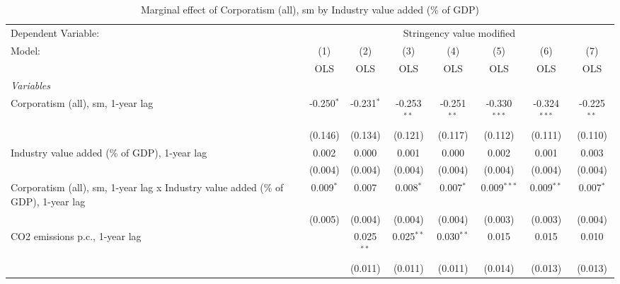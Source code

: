 
\begin{table}[htbp]
   \caption{Marginal effect of Corporatism (all), sm by Industry value added (\% of GDP)}
   \centering
   \begin{tabular}{lccccccc}
      \toprule
      Dependent Variable: & \multicolumn{7}{c}{Stringency value modified}\\
      Model:                                                                            & (1)          & (2)          & (3)           & (4)           & (5)            & (6)            & (7)\\  
                                                                                        &  OLS         & OLS          & OLS           & OLS           & OLS            & OLS            & OLS\\  
      \midrule
      \emph{Variables}\\
      Corporatism (all), sm, 1-year lag                                                 & -0.250$^{*}$ & -0.231$^{*}$ & -0.253$^{**}$ & -0.251$^{**}$ & -0.330$^{***}$ & -0.324$^{***}$ & -0.225$^{**}$\\   
                                                                                        & (0.146)      & (0.134)      & (0.121)       & (0.117)       & (0.112)        & (0.111)        & (0.110)\\   
      Industry value added (\% of GDP), 1-year lag                                      & 0.002        & 0.000        & 0.001         & 0.000         & 0.002          & 0.001          & 0.003\\   
                                                                                        & (0.004)      & (0.004)      & (0.004)       & (0.004)       & (0.004)        & (0.004)        & (0.004)\\   
      Corporatism (all), sm, 1-year lag x Industry value added (\% of GDP), 1-year lag  & 0.009$^{*}$  & 0.007        & 0.008$^{*}$   & 0.007$^{*}$   & 0.009$^{***}$  & 0.009$^{**}$   & 0.007$^{*}$\\   
                                                                                        & (0.005)      & (0.004)      & (0.004)       & (0.004)       & (0.003)        & (0.003)        & (0.004)\\   
      CO2 emissions p.c., 1-year lag                                                    &              & 0.025$^{**}$ & 0.025$^{**}$  & 0.030$^{**}$  & 0.015          & 0.015          & 0.010\\   
                                                                                        &              & (0.011)      & (0.011)       & (0.011)       & (0.014)        & (0.013)        & (0.013)\\   

\end{tabular}
\end{table}
